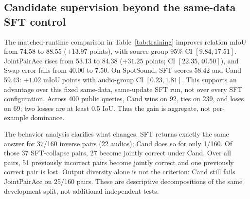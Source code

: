 \subsection{Candidate supervision beyond the same-data SFT control}
The matched-runtime comparison in Table~\ref{tab:training} improves relation mIoU from 74.58 to 88.55 ($+13.97$ points), with source-group 95\% CI $[9.84,17.51]$. JointPairAcc rises from 53.13 to 84.38 ($+31.25$ points; CI $[22.35,40.50]$), and Swap error falls from 40.00 to 7.50. On SpotSound, SFT scores 58.42 and Cand 59.43: $+1.02$ mIoU points with audio-group CI $[0.23,1.81]$. This supports an advantage over this fixed same-data, same-update SFT run, not over every SFT configuration. Across 400 public queries, Cand wins on 92, ties on 239, and loses on 69; two losses are at least 0.5 IoU. Thus the gain is aggregate, not per-example dominance.

The behavior analysis clarifies what changes. SFT returns exactly the same answer for 37/160 inverse pairs (22 audios); Cand does so for only 1/160. Of those 37 SFT-collapse pairs, 27 become jointly correct under Cand. Over all pairs, 51 previously incorrect pairs become jointly correct and one previously correct pair is lost. Output diversity alone is not the criterion: Cand still fails JointPairAcc on 25/160 pairs. These are descriptive decompositions of the same development split, not additional independent tests.
